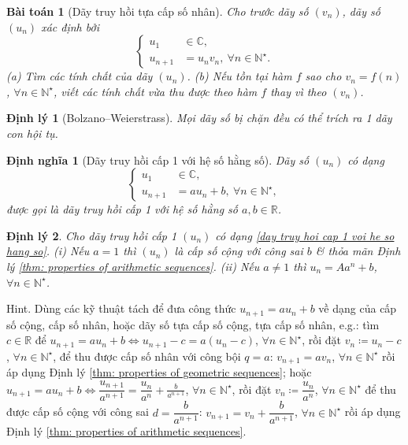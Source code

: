 \documentclass{article}
\newtheorem{baitoan}{Bài toán}
\newtheorem{dinhly}{Định lý}
\newtheorem{dinhnghia}{Định nghĩa}
\begin{document}
\begin{baitoan}[Dãy truy hồi tựa cấp số nhân]
	Cho trước dãy số $(v_n)$, dãy số $(u_n)$ xác định bởi
	\begin{equation*}
		\left\{\begin{split}
			u_1&\in\mathbb{C},\\
			u_{n+1} &= u_nv_n,\ \forall n\in\mathbb{N}^\star.
		\end{split}\right.
	\end{equation*}
	(a) Tìm các tính chất của dãy $(u_n)$. (b) Nếu tồn tại hàm $f$ sao cho $v_n = f(n)$, $\forall n\in\mathbb{N}^\star$, viết các tính chất vừa thu được theo hàm $f$ thay vì theo $(v_n)$.
\end{baitoan}

\begin{dinhly}[Bolzano--Weierstrass]
	Mọi dãy số bị chặn đều có thể trích ra 1 dãy con hội tụ.
\end{dinhly}

\begin{dinhnghia}[Dãy truy hồi cấp 1 với hệ số hằng số]
	Dãy số $(u_n)$ có dạng
	\begin{equation}
		\label{day truy hoi cap 1 voi he so hang so}
		\left\{\begin{split}
			u_1&\in\mathbb{C},\\
			u_{n+1} &= au_n + b,\ \forall n\in\mathbb{N}^\star,
		\end{split}\right.
	\end{equation}
	được gọi là {\rm dãy truy hồi cấp 1 với hệ số hằng số} $a,b\in\mathbb{R}$.
\end{dinhnghia}

\begin{dinhly}
	Cho dãy truy hồi cấp 1 $(u_n)$ có dạng \eqref{day truy hoi cap 1 voi he so hang so}. (i) Nếu $a = 1$ thì $(u_n)$ là cấp số cộng với công sai $b$ \& thỏa mãn Định lý \ref{thm: properties of arithmetic sequences}. (ii) Nếu $a\ne1$ thì $u_n = Aa^n + b$, $\forall n\in\mathbb{N}^\star$.
\end{dinhly}
{\sf Hint.} Dùng các kỹ thuật tách để đưa công thức $u_{n+1} = au_n + b$ về dạng của cấp số cộng, cấp số nhân, hoặc dãy số tựa cấp số cộng, tựa cấp số nhân, e.g.: tìm $c\in\mathbb{R}$ để $u_{n+1} = au_n + b\Leftrightarrow u_{n+1} - c = a(u_n - c)$, $\forall n\in\mathbb{N}^\star$, rồi đặt $v_n\coloneqq u_n - c$, $\forall n\in\mathbb{N}^\star$, để thu được cấp số nhân với công bội $q = a$: $v_{n+1} = av_n$, $\forall n\in\mathbb{N}^\star$ rồi áp dụng Định lý \ref{thm: properties of geometric sequences}; hoặc $u_{n+1} = au_n + b\Leftrightarrow\dfrac{u_{n+1}}{a^{n+1}} = \dfrac{u_n}{a^n} + \frac{b}{a^{n+1}}$, $\forall n\in\mathbb{N}^\star$, rồi đặt $v_n\coloneqq\dfrac{u_n}{a^n}$, $\forall n\in\mathbb{N}^\star$ để thu được cấp số cộng với công sai $d = \dfrac{b}{a^{n+1}}$: $v_{n+1} = v_n + \dfrac{b}{a^{n+1}}$, $\forall n\in\mathbb{N}^\star$ rồi áp dụng Định lý \ref{thm: properties of arithmetic sequences}.
\end{document}
